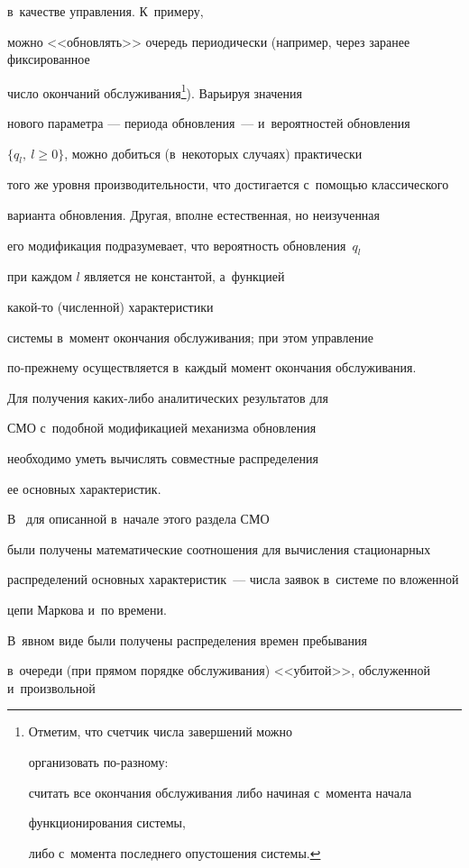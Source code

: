 в~качестве управ\-ле\-ния. К~примеру,

можно <<обновлять>> очередь периодически (например, через заранее фиксированное 

число окончаний обслуживания\footnote{Отметим, что счетчик числа завершений можно 

организовать по-раз\-но\-му:

считать все окончания обслуживания либо начиная с~момента начала 

функционирования сис\-те\-мы,

либо с~момента последнего опустошения сис\-те\-мы.}). Варь\-и\-руя значения

нового па\-ра\-мет\-ра --- периода обновления~--- и~вероятностей об\-нов\-ле\-ния

${\{q_l, \ l \ge 0\}}$, можно добиться (в~некоторых случаях) практически

того же уровня про\-из\-во\-ди\-тель\-ности, что достигается с~по\-мощью классического 

варианта обновления. Другая, вполне естественная, но неизученная

его модификация подразумевает, что вероятность обновления~$q_l$

при каждом $l$ является не константой, а~функцией

ка\-кой-то (чис\-лен\-ной) характеристики

системы в~момент окончания обслуживания; при этом управление

по-прежнему осуществляется в~каждый момент окончания обслуживания.

Для получения ка\-ких-ли\-бо аналитических результатов для

СМО с~подобной модификацией механизма обновления

необходимо уметь вычислять совместные распределения

ее основных характеристик.



В~\cite{11} для описанной в~начале этого раздела СМО

были получены математические соотношения для вычисления стационарных 

распределений основных характеристик~--- числа заявок в~сис\-те\-ме по вложенной 

цепи Маркова и~по времени.

В~явном виде были получены распределения времен пребывания 

в~очереди (при прямом порядке обслуживания) <<убитой>>, обслуженной и~произвольной 

